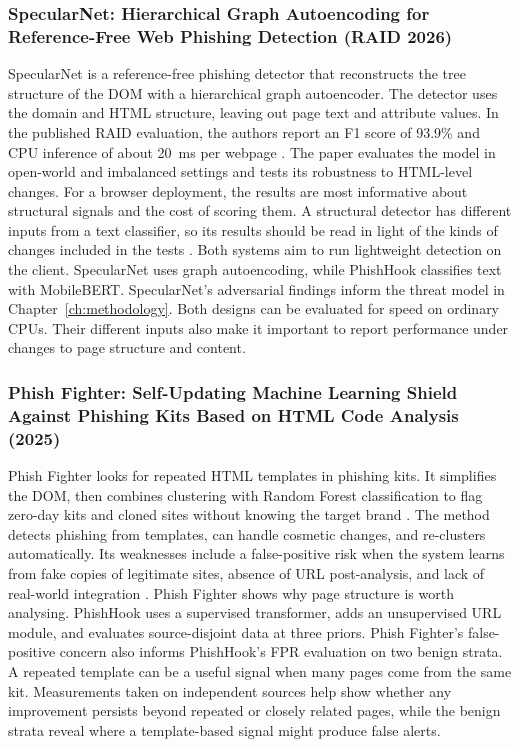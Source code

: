 \documentclass{FastFyp}
\begin{document}
\subsubsection{SpecularNet: Hierarchical Graph Autoencoding for Reference-Free Web Phishing Detection (RAID 2026)}
SpecularNet is a reference-free phishing detector that reconstructs the tree structure of the DOM with a hierarchical graph autoencoder. The detector uses the domain and HTML structure, leaving out page text and attribute values. In the published RAID evaluation, the authors report an F1 score of 93.9\% and CPU inference of about 20~ms per webpage \cite{specularnet2026}. The paper evaluates the model in open-world and imbalanced settings and tests its robustness to HTML-level changes. For a browser deployment, the results are most informative about structural signals and the cost of scoring them. A structural detector has different inputs from a text classifier, so its results should be read in light of the kinds of changes included in the tests \cite{specularnet2026}. Both systems aim to run lightweight detection on the client. SpecularNet uses graph autoencoding, while PhishHook classifies text with MobileBERT. SpecularNet's adversarial findings inform the threat model in Chapter~\ref{ch:methodology}. Both designs can be evaluated for speed on ordinary CPUs. Their different inputs also make it important to report performance under changes to page structure and content.

\subsubsection{Phish Fighter: Self-Updating Machine Learning Shield Against Phishing Kits Based on HTML Code Analysis (2025)}
Phish Fighter looks for repeated HTML templates in phishing kits. It simplifies the DOM, then combines clustering with Random Forest classification to flag zero-day kits and cloned sites without knowing the target brand \cite{phishfighter2025}. The method detects phishing from templates, can handle cosmetic changes, and re-clusters automatically. Its weaknesses include a false-positive risk when the system learns from fake copies of legitimate sites, absence of URL post-analysis, and lack of real-world integration \cite{phishfighter2025}. Phish Fighter shows why page structure is worth analysing. PhishHook uses a supervised transformer, adds an unsupervised URL module, and evaluates source-disjoint data at three priors. Phish Fighter's false-positive concern also informs PhishHook's FPR evaluation on two benign strata. A repeated template can be a useful signal when many pages come from the same kit. Measurements taken on independent sources help show whether any improvement persists beyond repeated or closely related pages, while the benign strata reveal where a template-based signal might produce false alerts.
\end{document}
